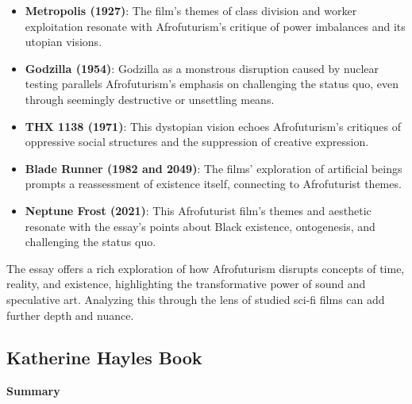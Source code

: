 \documentclass[11pt,fleqn]{book} %
\begin{document}
\begin{itemize}
\item \textbf{Metropolis (1927)}:  The film's themes of class division and worker exploitation resonate with Afrofuturism's critique of power imbalances and its utopian visions. 

\item \textbf{Godzilla (1954)}:  Godzilla as a monstrous disruption caused by nuclear testing parallels Afrofuturism's emphasis on challenging the status quo, even through seemingly destructive or unsettling means.

\item \textbf{THX 1138 (1971)}: This dystopian vision echoes Afrofuturism's critiques of oppressive social structures and the suppression of creative expression.

\item \textbf{Blade Runner (1982 and 2049)}: The films' exploration of artificial beings prompts a reassessment of existence itself, connecting to Afrofuturist themes.

\item \textbf{Neptune Frost (2021)}: This Afrofuturist film's themes and aesthetic resonate with the essay's points about Black existence, ontogenesis, and challenging the status quo.
\end{itemize}

\vspace{5pt}

The essay offers a rich exploration of how Afrofuturism disrupts concepts of time, reality, and existence, highlighting the transformative power of sound and speculative art. Analyzing this through the lens of studied sci-fi films can add further depth and nuance. 




\subsection{Katherine Hayles Book}
\textbf{Summary}
\end{document}
